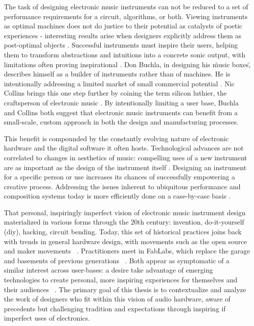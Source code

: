 The task of designing electronic music instruments can not be reduced to a set of performance requirements for a circuit, algorithms, or both. Viewing instruments as optimal machines does not do justice to their potential as catalysts of poetic experiences - interesting results arise when designers explicitly address them as post-optimal objects \cite{dunne2005}. Successful instruments must inspire their users, helping them to transform abstractions and intuitions into a concrete sonic output, with limitations often proving inspirational \cite{evens2005,rovan2009}. Don Buchla, in designing his \"music boxes\", describes himself as a builder of instruments rather than of machines. He is intentionally addressing a limited market of small commercial potential \cite{pinch2001}. Nic Collins brings this one step further by coining the term silicon luthier, the craftsperson of electronic music \cite{collins2008}. By intentionally limiting a user base, Buchla and Collins both suggest that electronic music instruments can benefit from a small-scale, custom approach in both the design and manufacturing processes. 

This benefit is compounded by the constantly evolving nature of electronic hardware and the digital software it often hosts. Technological advances are not correlated to changes in aesthetics of music: compelling uses of a new instrument are as important as the design of the instrument itself \cite{braun2000}. Designing an instrument for a specific person or use increases its chances of successfully empowering a creative process. Addressing the issues inherent to ubiquitous performance and composition systems today is more efficiently done on a case-by-case basis \cite{armstrong2006,haslett2005}. 

That personal, inspiringly imperfect vision of electronic music instrument design materialized in various forms through the 20th century: invention, do-it-yourself (diy), hacking, circuit bending. Today, this set of historical practices joins back with trends in general hardware design, with movements such as the open source and maker movements ~\cite{mellis2014,perner2011}. Practitioners meet in FabLabs, which replace the garage and basements of previous generations ~\cite{mellis2011}. Both appear as symptomatic of a similar interest across user-bases: a desire take advantage of emerging technologies to create personal, more inspiring experiences for themselves and their audiences ~\cite{hermans2014}. The primary goal of this thesis is to contextualize and analyze the work of designers who fit within this vision of audio hardware, aware of precedents but challenging tradition and expectations through inspiring if imperfect uses of electronics.


